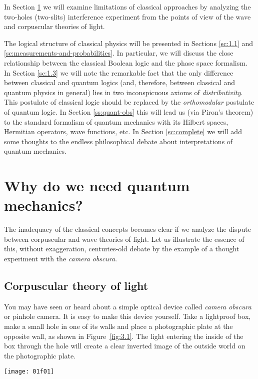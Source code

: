 \documentclass[nochecklpage]{stefan1}
\theoremstyle{definition}
\begin{document}
In Section \ref{sc:thought} we will examine limitations of classical
approaches by analyzing the two-holes (two-slits) interference
experiment from the points of view of the wave and corpuscular theories
of light.

The logical structure of classical physics will be presented in Sections
\ref{sc:1.1} and \ref{sc:measurements-and-probabilities}. In particular,
we will discuss the close relationship between the classical Boolean
logic and the phase space formalism. In Section \ref{sc:1.3} we will
note the remarkable fact that the only difference between classical and
quantum logics (and, therefore, between classical and quantum physics
in general) lies in two inconspicuous axioms of \emph{distributivity}. This
postulate of classical logic should be replaced by the \emph{orthomodular}
postulate of quantum logic. In Section \ref{ss:quant-obs} this will lead us (via Piron's theorem) to the standard formalism
of quantum mechanics with its Hilbert spaces, Hermitian operators, wave
functions, etc. In Section \ref{sc:complete} we will add some thoughts
to the endless philosophical debate about interpretations of quantum
mechanics.

\section{Why do we need quantum mechanics?}\label{sc:thought}
The inadequacy of the classical concepts becomes clear if we analyze the
dispute between corpuscular and wave theories of light. Let us
illustrate the essence of this, without exaggeration, centuries-old
debate by the example of a thought experiment with the \emph{camera}
\emph{obscura}.

\subsection{Corpuscular theory of light}\label{ss:corpuscular}
You may have seen or heard about a simple optical device called
\emph{camera obscura} or pinhole camera. It is easy to make this device
yourself. Take a lightproof box, make a small hole in one of its walls
and place a photographic plate at the opposite wall, as shown in
Figure~\ref{fig:3.1}. The light entering the inside of the box through the hole
will create a clear inverted image of the outside world on the
photographic plate.

\begin{SCfigure}[50][b!]
\texttt{[image: 01f01]}
\caption{The image in the pinhole camera is created by rectilinear beams (rays)
of light.}
\label{fig:3.1}
\end{SCfigure}
\end{document}
